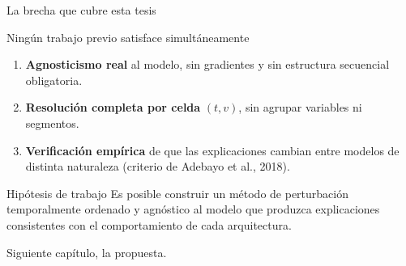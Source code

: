 \documentclass{beamer}
\begin{document}
\begin{frame}{La brecha que cubre esta tesis}
    \small
    \begin{alertblock}{Ningún trabajo previo satisface simultáneamente}
        \begin{enumerate}
            \item \textbf{Agnosticismo real} al modelo, sin gradientes y
            sin estructura secuencial obligatoria.
            \item \textbf{Resolución completa por celda} $(t,v)$, sin
            agrupar variables ni segmentos.
            \item \textbf{Verificación empírica} de que las explicaciones
            cambian entre modelos de distinta naturaleza (criterio de
            Adebayo et al., 2018).
        \end{enumerate}
    \end{alertblock}
    \vspace{0.2cm}
    \begin{block}{Hipótesis de trabajo}
        Es posible construir un método de perturbación temporalmente
        ordenado y agnóstico al modelo que produzca explicaciones
        consistentes con el comportamiento de cada arquitectura.
    \end{block}
    \begin{center}
        \footnotesize Siguiente capítulo, la propuesta.
    \end{center}
\end{frame}
\end{document}
